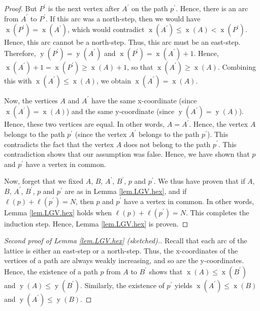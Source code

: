 \documentclass[reqno]{amsart}%
\newcommand{\0}{\phantom{c}}
\newenvironment{verlong}{}{}
\theoremstyle{plain}
\theoremstyle{definition}
\numberwithin{equation}{section}
\begin{document}
\begin{verlong}
\begin{proof}
But $P^{\prime}$ is the next vertex after $A^{\prime}$ on the path $p^{\prime
}$. Hence, there is an arc from $A^{\prime}$ to $P^{\prime}$. If this arc was
a north-step, then we would have $\operatorname*{x}\left(  P^{\prime}\right)
=\operatorname*{x}\left(  A^{\prime}\right)  $, which would contradict
$\operatorname*{x}\left(  A^{\prime}\right)  \leq\operatorname*{x}\left(
A\right)  <\operatorname*{x}\left(  P^{\prime}\right)  $. Hence, this arc
cannot be a north-step. Thus, this arc must be an east-step. Therefore,
$\operatorname*{y}\left(  P^{\prime}\right)  =\operatorname*{y}\left(
A^{\prime}\right)  $ and $\operatorname*{x}\left(  P^{\prime}\right)
=\operatorname*{x}\left(  A^{\prime}\right)  +1$. Hence, $\operatorname*{x}%
\left(  A^{\prime}\right)  +1=\operatorname*{x}\left(  P^{\prime}\right)
\geq\operatorname*{x}\left(  A\right)  +1$, so that $\operatorname*{x}\left(
A^{\prime}\right)  \geq\operatorname*{x}\left(  A\right)  $. Combining this
with $\operatorname*{x}\left(  A^{\prime}\right)  \leq\operatorname*{x}\left(
A\right)  $, we obtain $\operatorname*{x}\left(  A^{\prime}\right)
=\operatorname*{x}\left(  A\right)  $.

Now, the vertices $A$ and $A^{\prime}$ have the same x-coordinate (since
$\operatorname*{x}\left(  A^{\prime}\right)  =\operatorname*{x}\left(
A\right)  $) and the same y-coordinate (since $\operatorname*{y}\left(
A^{\prime}\right)  =\operatorname*{y}\left(  A\right)  $). Hence, these two
vertices are equal. In other words, $A=A^{\prime}$. Hence, the vertex $A$
belongs to the path $p^{\prime}$ (since the vertex $A^{\prime}$ belongs to the
path $p^{\prime}$). This contradicts the fact that the vertex $A$ does not
belong to the path $p^{\prime}$. This contradiction shows that our assumption
was false. Hence, we have shown that $p$ and $p^{\prime}$ have a vertex in common.

Now, forget that we fixed $A$, $B$, $A^{\prime}$, $B^{\prime}$, $p$ and
$p^{\prime}$. We thus have proven that if $A$, $B$, $A^{\prime}$, $B^{\prime}%
$, $p$ and $p^{\prime}$ are as in Lemma \ref{lem.LGV.hex}, and if $\ell\left(
p\right)  +\ell\left(  p^{\prime}\right)  =N$, then $p$ and $p^{\prime}$ have
a vertex in common. In other words, Lemma \ref{lem.LGV.hex} holds when
$\ell\left(  p\right)  +\ell\left(  p^{\prime}\right)  =N$. This completes the
induction step. Hence, Lemma \ref{lem.LGV.hex} is proven.
\end{proof}

\begin{proof}
[Second proof of Lemma \ref{lem.LGV.hex} (sketched).]Recall that each arc of
the lattice is either an east-step or a north-step. Thus, the x-coordinates of
the vertices of a path are always weakly increasing, and so are the
y-coordinates. Hence, the existence of a path $p$ from $A$ to $B^{\prime}$
shows that $\operatorname*{x}\left(  A\right)  \leq\operatorname*{x}\left(
B^{\prime}\right)  $ and $\operatorname*{y}\left(  A\right)  \leq
\operatorname*{y}\left(  B^{\prime}\right)  $. Similarly, the existence of
$p^{\prime}$ yields $\operatorname*{x}\left(  A^{\prime}\right)
\leq\operatorname*{x}\left(  B\right)  $ and $\operatorname*{y}\left(
A^{\prime}\right)  \leq\operatorname*{y}\left(  B\right)  $.


\end{proof}
\end{verlong}
\end{document}
